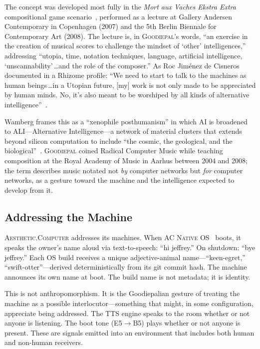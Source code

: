 \documentclass[10pt,letterpaper,twocolumn]{article}
\newcommand{\ac}{\textsc{Aesthetic.Computer}}
\newcommand{\acos}{\textsc{AC Native OS}}
\newcommand{\gp}{\textsc{Goodiepal}}
\begin{document}
The concept was developed most fully in the \emph{Mort aux Vaches Ekstra Extra} compositional game scenario~\citep{goodiepal2007mortauxvaches}, performed as a lecture at Gallery Andersen Contemporary in Copenhagen (2007) and the 5th Berlin Biennale for Contemporary Art (2008). The lecture is, in \gp{}'s words, ``an exercise in the creation of musical scores to challenge the mindset of `other' intelligences,'' addressing ``utopia, time, notation techniques, language, artificial intelligence, `unscannability'\,\ldots and the role of the composer.'' As Roc Jim\'enez de Cisneros documented in a Rhizome profile: ``We need to start to talk to the machines as human beings\,\ldots in a Utopian future, [my] work is not only made to be appreciated by human minds. No, it's also meant to be worshiped by all kinds of alternative intelligence''~\citep{rhizome2011goodiepal}.

Wamberg frames this as a ``xenophile posthumanism'' in which AI is broadened to ALI---Alternative Intelligence---a network of material clusters that extends beyond silicon computation to include ``the cosmic, the geological, and the biological''~\citep{wamberg2022artforaliens}. \gp{} coined Radical Computer Music while teaching composition at the Royal Academy of Music in Aarhus between 2004 and 2008; the term describes music notated not \emph{by} computer networks but \emph{for} computer networks, as a gesture toward the machine and the intelligence expected to develop from it.

\subsection{Addressing the Machine}

\ac{} addresses its machines. When \acos{}~\citep{scudder2026os} boots, it speaks the owner's name aloud via text-to-speech: ``hi jeffrey.'' On shutdown: ``bye jeffrey.'' Each OS build receives a unique adjective-animal name---``keen-egret,'' ``swift-otter''---derived deterministically from its git commit hash. The machine announces its own name at boot. The build name is not metadata; it is identity.

This is not anthropomorphism. It is the Goodiepalian gesture of treating the machine as a possible interlocutor---something that might, in some configuration, appreciate being addressed. The TTS engine speaks to the room whether or not anyone is listening. The boot tone (E5$\rightarrow$B5) plays whether or not anyone is present. These are signals emitted into an environment that includes both human and non-human receivers.
\end{document}

